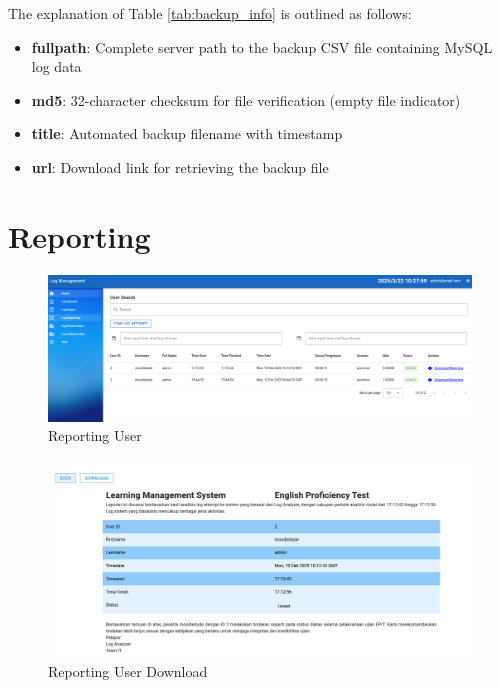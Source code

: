 The explanation of Table \ref{tab:backup_info} is outlined as follows:

\begin{itemize}
    \item \textbf{fullpath}: Complete server path to the backup CSV file containing MySQL log data
    \item \textbf{md5}: 32-character checksum for file verification (empty file indicator)
    \item \textbf{title}: Automated backup filename with timestamp
    \item \textbf{url}: Download link for retrieving the backup file
\end{itemize}



\section{Reporting}
\begin{figure}[H] 
    \centering
    \includegraphics[width=14cm]{figure/log_reporting_1.png}
    \caption{Reporting User}
    \label{fig:log_reporting_1}
\end{figure}

\begin{figure}[H] 
    \centering
    \includegraphics[width=14cm]{figure/log_reporting_2.png}
    \caption{Reporting User Download}
    \label{fig:log_reporting_2}
\end{figure}

